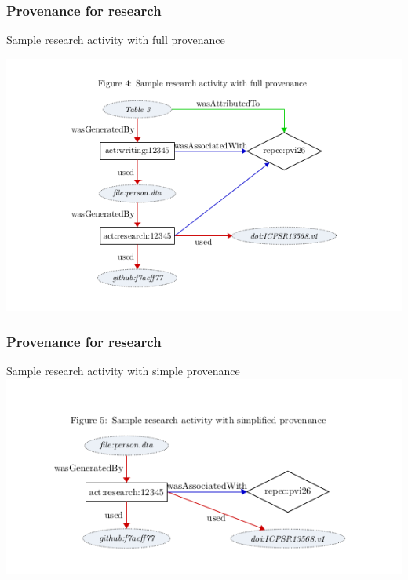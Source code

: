 \begin{frame}
	\frametitle{Provenance for research}
	\begin{block}{Sample research activity with full provenance}

	\includegraphics[scale=0.5]{tikz-authorship-example}
	\end{block}
\end{frame}


\begin{frame}
	\frametitle{Provenance for research}
	\begin{block}{Sample research activity with simple provenance}
		\centering
		\includegraphics[scale=0.5]{tikz-authorship-example-simple}
	\end{block}
\end{frame}


